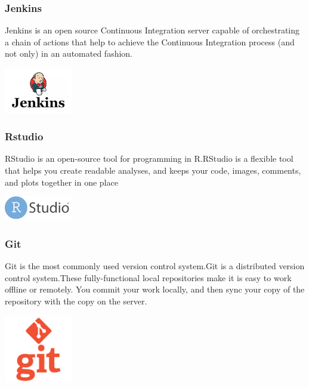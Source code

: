 \documentclass[11pt]{article}
\begin{document}
\subsubsection{Jenkins}
\hspace{1in}Jenkins is an open source Continuous Integration server capable of orchestrating a chain of actions that help to achieve the Continuous Integration process (and not only) in an automated fashion.


\vspace{2cm}

\includegraphics[width=30mm,scale=0.5]{jenkins}
 \subsubsection{Rstudio}
 \hspace{1in}RStudio is an open-source tool for programming in R.RStudio is a flexible tool that helps you create readable analyses, and keeps your code, images, comments, and plots together in one place
 
 \vspace{2cm}
 
\includegraphics[width=30mm,scale=0.5]{rp}
 \subsubsection{Git}
 \hspace{1in}Git is the most commonly used version control system.Git is a distributed version control system.These fully-functional local repositories make it is easy to work offline or remotely. You commit your work locally, and then sync your copy of the repository with the copy on the server.
 
 
 \vspace{2cm}
 
 
 \includegraphics[width=30mm,scale=0.5]{git}
\end{document}
